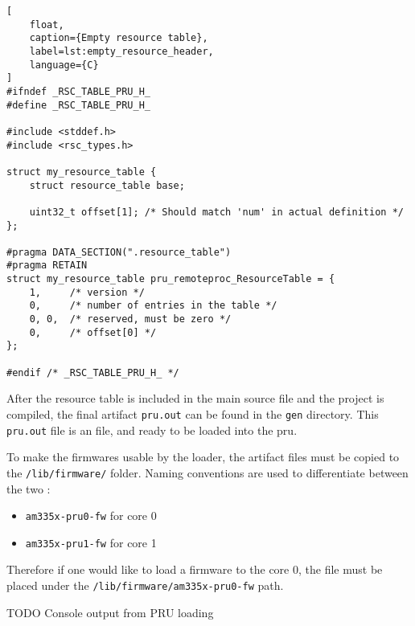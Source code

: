 \begin{lstlisting}[
	float,
	caption={Empty resource table},
	label=lst:empty_resource_header,
	language={C}
]
#ifndef _RSC_TABLE_PRU_H_
#define _RSC_TABLE_PRU_H_

#include <stddef.h>
#include <rsc_types.h>

struct my_resource_table {
	struct resource_table base;

	uint32_t offset[1]; /* Should match 'num' in actual definition */
};

#pragma DATA_SECTION(".resource_table")
#pragma RETAIN
struct my_resource_table pru_remoteproc_ResourceTable = {
	1,     /* version */
	0,     /* number of entries in the table */
	0, 0,  /* reserved, must be zero */
	0,     /* offset[0] */
};

#endif /* _RSC_TABLE_PRU_H_ */
\end{lstlisting}

After the resource table is included in the main source file and the project is compiled, the final artifact \verb|pru.out| can be found in the \verb|gen| directory. This \verb|pru.out| file is an \elf{} file, and ready to be loaded into the pru.

To make the firmwares usable by the loader, the artifact files must be copied to the \verb|/lib/firmware/| folder. Naming conventions are used to differentiate between the two \pru{}:
\begin{itemize}
	\item \verb|am335x-pru0-fw| for \pru{} core 0
	\item \verb|am335x-pru1-fw| for \pru{} core 1
\end{itemize}
Therefore if one would like to load a firmware to the \pru{} core 0, the \elf{} file must be placed under the \verb|/lib/firmware/am335x-pru0-fw| path.

TODO Console output from PRU loading

